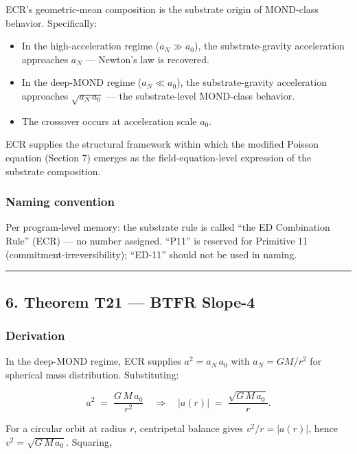 \documentclass[
  11pt,a4paper]{article}
\providecommand{\tightlist}{%
  \setlength{\itemsep}{0pt}\setlength{\parskip}{0pt}}
\begin{document}
ECR's geometric-mean composition is the substrate origin of MOND-class
behavior. Specifically:

\begin{itemize}
\tightlist
\item
  In the high-acceleration regime (\(a_N \gg a_0\)), the
  substrate-gravity acceleration approaches \(a_N\) --- Newton's law is
  recovered.
\item
  In the deep-MOND regime (\(a_N \ll a_0\)), the substrate-gravity
  acceleration approaches \(\sqrt{a_N\,a_0}\) --- the substrate-level
  MOND-class behavior.
\item
  The crossover occurs at acceleration scale \(a_0\).
\end{itemize}

ECR supplies the structural framework within which the modified Poisson
equation (Section 7) emerges as the field-equation-level expression of
the substrate composition.

\subsubsection{Naming convention}\label{naming-convention}

Per program-level memory: the substrate rule is called ``the ED
Combination Rule'' (ECR) --- no number assigned. ``P11'' is reserved for
Primitive 11 (commitment-irreversibility); ``ED-11'' should not be used
in naming.

\begin{center}\rule{0.5\linewidth}{0.5pt}\end{center}

\subsection{6. Theorem T21 --- BTFR
Slope-4}\label{theorem-t21-btfr-slope-4}

\subsubsection{Derivation}\label{derivation}

In the deep-MOND regime, ECR supplies \(a^2 = a_N\,a_0\) with
\(a_N = GM/r^2\) for spherical mass distribution. Substituting:

\[a^2 \;=\; \frac{G\,M\,a_0}{r^2} \quad\Longrightarrow\quad |a(r)| \;=\; \frac{\sqrt{G\,M\,a_0}}{r}.\]

For a circular orbit at radius \(r\), centripetal balance gives
\(v^2/r = |a(r)|\), hence \(v^2 = \sqrt{G\,M\,a_0}\). Squaring,
\end{document}
